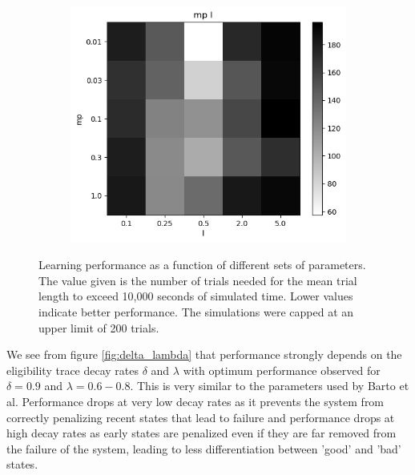 \documentclass{article}
\begin{document}
\begin{figure}[h]
\begin{subfigure}[t]{0.28\linewidth}
		\label{fig:alpha_beta}	
	\end{subfigure}
	\hspace{0.05\linewidth}
	\begin{subfigure}[t]{0.28\linewidth}
		\centering
		\includegraphics[width = 1.0\linewidth, trim={0 0 0 0}, clip=true]{figures/test_mp_l_heat.png}
		\label{fig:mp_l}	
	\end{subfigure}
\caption{Learning performance as a function of different sets of parameters. The value given is the number of trials needed for the mean trial length to exceed 10,000 seconds of simulated time. Lower values indicate better performance. The simulations were capped at an upper limit of 200 trials.}
\label{fig:params}
\end{figure}

We see from figure \ref{fig:delta_lambda} that performance strongly depends on the eligibility trace decay rates $\delta$ and $\lambda$ with optimum performance observed for $\delta = 0.9$ and $\lambda = 0.6-0.8$. This is very similar to the parameters used by Barto et al. Performance drops at very low decay rates as it prevents the system from correctly penalizing recent states that lead to failure and performance drops at high decay rates as early states are penalized even if they are far removed from the failure of the system, leading to less differentiation between 'good' and 'bad' states.
\end{document}
